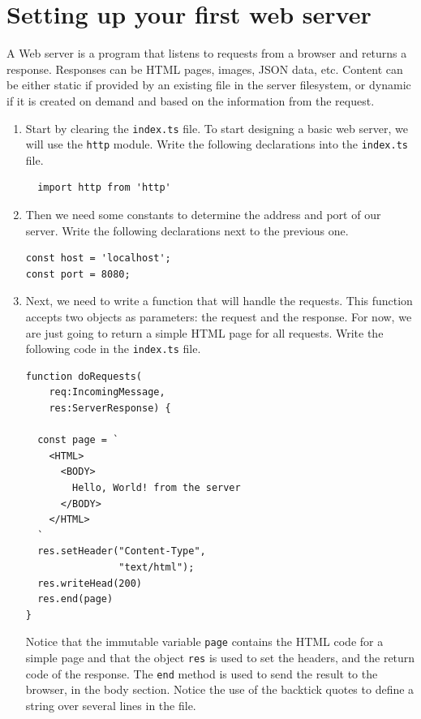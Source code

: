 \documentclass[12pt,a5paper]{memoir}
\begin{document}
\chapter{Setting up your first web server}

A Web server is a program that listens to requests from a browser and returns a
response. Responses can be HTML pages, images, JSON data, etc. Content can be
either static if provided by an existing file in the server filesystem, or
dynamic if it is created on demand and based on the information from the request.

\begin{enumerate}

\item Start by clearing the \texttt{index.ts} file. To start designing a basic
web server, we will use the \texttt{http} module. Write the following declarations into the 
\texttt{index.ts} file.

\begin{lstlisting}
  import http from 'http'
\end{lstlisting}

\item Then we need some constants to determine the address and port of our
server. Write the following declarations next to the previous one.

\begin{lstlisting}
const host = 'localhost';
const port = 8080;
\end{lstlisting}

\item Next, we need to write a function that will handle the requests. This
function accepts two objects as parameters: the request and the response. For
now, we are just going to return a simple HTML page for all requests. Write the
following code in the \texttt{index.ts} file.

\begin{lstlisting}
function doRequests(
    req:IncomingMessage, 
    res:ServerResponse) {

  const page = `
    <HTML>
      <BODY>
        Hello, World! from the server
      </BODY>
    </HTML>
  `
  res.setHeader("Content-Type", 
                "text/html");
  res.writeHead(200)
  res.end(page)
}
\end{lstlisting}
  
Notice that the immutable variable \texttt{page} contains the HTML code for a
simple page and that the object \texttt{res} is used to set the headers, and the
return code of the response. The \texttt{end} method is used to send the result
to the browser, in the body section. Notice the use of the backtick quotes to
define a string over several lines in the file.


\end{enumerate}
\end{document}

